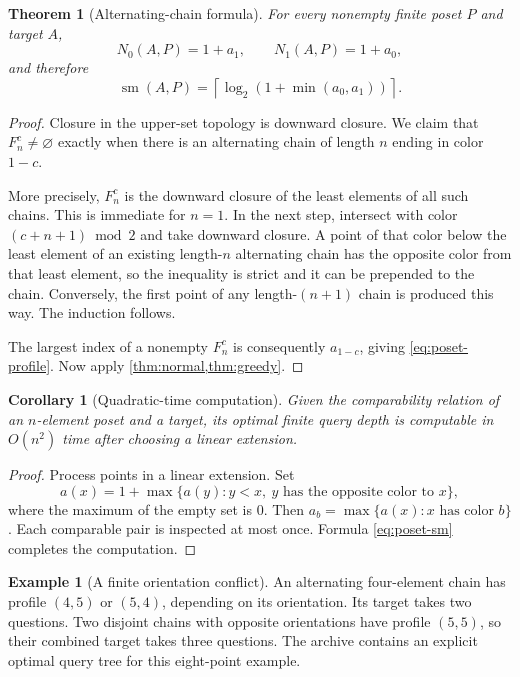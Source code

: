 \documentclass[11pt,letterpaper]{article}
\numberwithin{equation}{section}
\newtheorem{theorem}{Theorem}[section]
\newtheorem{corollary}[corollary]{Corollary}
\theoremstyle{definition}
\newtheorem{example}[example]{Example}
\theoremstyle{remark}
\newcommand{\sm}{\operatorname{sm}}
\newcommand{\ceil}[1]{\left\lceil#1\right\rceil}
\begin{document}
\begin{theorem}[Alternating-chain formula]\label{thm:posets}
For every nonempty finite poset $P$ and target $A$,
\begin{equation}\label{eq:poset-profile}
 N_0(A,P)=1+a_1,\qquad N_1(A,P)=1+a_0,
\end{equation}
and therefore
\begin{equation}\label{eq:poset-sm}
 \boxed{\ \sm(A,P)=\ceil{\log_2(1+\min(a_0,a_1))}.\ }
\end{equation}
\end{theorem}
\begin{proof}
Closure in the upper-set topology is downward closure. We claim that
$F^c_n\ne\varnothing$ exactly when there is an alternating chain of length
$n$ ending in color $1-c$.

More precisely, $F^c_n$ is the downward closure of the least elements of all
such chains. This is immediate for $n=1$. In the next step, intersect with color
$(c+n+1)\bmod2$ and take downward closure. A point of that color below the
least element of an existing length-$n$ alternating chain has the opposite
color from that least element, so the inequality is strict and it can be
prepended to the chain. Conversely, the first point of any length-$(n+1)$
chain is produced this way. The induction follows.

The largest index of a nonempty $F^c_n$ is consequently $a_{1-c}$, giving
\eqref{eq:poset-profile}. Now apply \cref{thm:normal,thm:greedy}.
\end{proof}

\begin{corollary}[Quadratic-time computation]
Given the comparability relation of an $n$-element poset and a target, its
optimal finite query depth is computable in $O(n^2)$ time after choosing a
linear extension.
\end{corollary}
\begin{proof}
Process points in a linear extension. Set
\[
 a(x)=1+\max\{a(y):y<x,\ y\text{ has the opposite color to }x\},
\]
where the maximum of the empty set is $0$. Then
$a_b=\max\{a(x):x\text{ has color }b\}$. Each comparable pair is inspected at
most once. Formula \eqref{eq:poset-sm} completes the computation.
\end{proof}

\begin{example}[A finite orientation conflict]
An alternating four-element chain has profile $(4,5)$ or $(5,4)$, depending on
its orientation. Its target takes two questions. Two disjoint chains with
opposite orientations have profile $(5,5)$, so their combined target takes
three questions. The archive contains an explicit optimal query tree for this
eight-point example.
\end{example}
\end{document}

